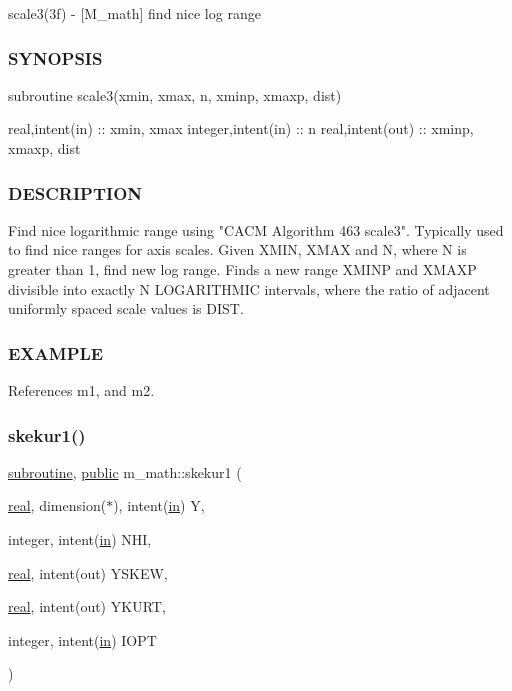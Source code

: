 scale3(3f) -\/ \mbox{[}M\+\_\+math\mbox{]} find nice log range 

\subsubsection*{S\+Y\+N\+O\+P\+S\+IS}

subroutine scale3(xmin, xmax, n, xminp, xmaxp, dist)

real,intent(in) \+:\+: xmin, xmax integer,intent(in) \+:\+: n real,intent(out) \+:\+: xminp, xmaxp, dist

\subsubsection*{D\+E\+S\+C\+R\+I\+P\+T\+I\+ON}

\begin{DoxyVerb}Find nice logarithmic range using "CACM Algorithm 463 scale3".
Typically used to find nice ranges for axis scales.  Given XMIN, XMAX
and N, where N is greater than 1, find new log range.  Finds a new
range XMINP and XMAXP divisible into exactly N LOGARITHMIC intervals,
where the ratio of adjacent uniformly spaced scale values
is DIST.
\end{DoxyVerb}


\subsubsection*{E\+X\+A\+M\+P\+LE}

References m1, and m2.

\mbox{\label{namespacem__math_a386a33c25fa5142ea1c6d45d3beae042}} 
\subsubsection{\texorpdfstring{skekur1()}{skekur1()}}
{\footnotesize\ttfamily \hyperlink{M__stopwatch_83_8txt_acfbcff50169d691ff02d4a123ed70482}{subroutine}, \hyperlink{M__stopwatch_83_8txt_a2f74811300c361e53b430611a7d1769f}{public} m\+\_\+math\+::skekur1 (\begin{DoxyParamCaption}\item[{\hyperlink{read__watch_83_8txt_abdb62bde002f38ef75f810d3a905a823}{real}, dimension($\ast$), intent(\hyperlink{M__journal_83_8txt_afce72651d1eed785a2132bee863b2f38}{in})}]{Y,  }\item[{integer, intent(\hyperlink{M__journal_83_8txt_afce72651d1eed785a2132bee863b2f38}{in})}]{N\+HI,  }\item[{\hyperlink{read__watch_83_8txt_abdb62bde002f38ef75f810d3a905a823}{real}, intent(out)}]{Y\+S\+K\+EW,  }\item[{\hyperlink{read__watch_83_8txt_abdb62bde002f38ef75f810d3a905a823}{real}, intent(out)}]{Y\+K\+U\+RT,  }\item[{integer, intent(\hyperlink{M__journal_83_8txt_afce72651d1eed785a2132bee863b2f38}{in})}]{I\+O\+PT }\end{DoxyParamCaption})}



